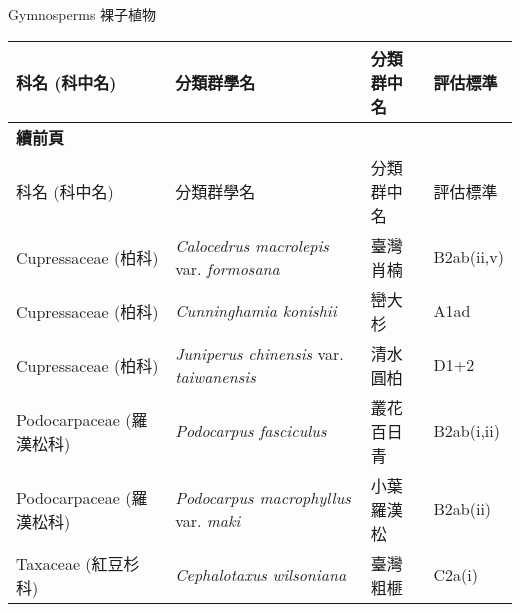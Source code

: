 \noindent\normalfont\selectfont Gymnosperms 裸子植物
\footnotesize\selectfont
        \begin{longtable}{p{3cm}p{5cm}p{3cm}p{4cm}}
        \toprule
          科名 (科中名) & 分類群學名 & 分類群中名 & 評估標準 \\
        \midrule 
        \endfirsthead

        {{\bfseries 續前頁 }} \\
        科名 (科中名) & 分類群學名 & 分類群中名 & 評估標準 \\
        \midrule
        \endhead
                Cupressaceae (柏科) & \textit{Calocedrus macrolepis} var. \textit{formosana}  & 臺灣肖楠 & B2ab(ii,v) \index{Calocedrus@\textit{Calocedrus}!macrolepis@\textit{macrolepis}!var. formosana@var. \textit{formosana}}  \index{臺灣肖楠} \\
    Cupressaceae (柏科) & \textit{Cunninghamia konishii}  & 巒大杉 & A1ad \index{Cunninghamia@\textit{Cunninghamia}!konishii@\textit{konishii}}  \index{巒大杉} \\
    Cupressaceae (柏科) & \textit{Juniperus chinensis} var. \textit{taiwanensis}  & 清水圓柏 & D1+2 \index{Juniperus@\textit{Juniperus}!chinensis@\textit{chinensis}!var. taiwanensis@var. \textit{taiwanensis}}  \index{清水圓柏} \\
    Podocarpaceae (羅漢松科) & \textit{Podocarpus fasciculus}  & 叢花百日青 & B2ab(i,ii) \index{Podocarpus@\textit{Podocarpus}!fasciculus@\textit{fasciculus}}  \index{叢花百日青} \\
    Podocarpaceae (羅漢松科) & \textit{Podocarpus macrophyllus} var. \textit{maki}  & 小葉羅漢松 & B2ab(ii) \index{Podocarpus@\textit{Podocarpus}!macrophyllus@\textit{macrophyllus}!var. maki@var. \textit{maki}}  \index{小葉羅漢松} \\
    Taxaceae (紅豆杉科) & \textit{Cephalotaxus wilsoniana}  & 臺灣粗榧 & C2a(i) \index{Cephalotaxus@\textit{Cephalotaxus}!wilsoniana@\textit{wilsoniana}}  \index{臺灣粗榧} \\
    \bottomrule
        \end{longtable}
